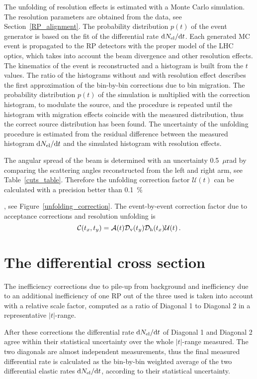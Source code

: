 \documentclass[TOTEM]{cernphprep}
\begin{document}
{		The unfolding of resolution effects is estimated with a Monte Carlo simulation. The resolution parameters are obtained from the data, see Section~\ref{RP_alignment}. The probability distribution $p(t)$ of the
		event generator is based on the fit of the differential rate ${\rm d}N_{\rm el}/{\rm d}t$. Each generated MC event is propagated to the RP detectors with the proper model of the LHC optics, which takes
		into account the beam divergence and other resolution effects. The kinematics of the event is reconstructed and a histogram is built from
		the $t$ values. The ratio of the histograms without and with resolution effect describes the first approximation of the bin-by-bin corrections due to bin migration. The probability distribution
		$p(t)$ of the simulation is multiplied with the correction histogram, to modulate the source, and the procedure is repeated until the histogram with migration effects
		coincide with the measured distribution, thus the correct source distribution has been found. The uncertainty of the unfolding procedure is estimated from the residual difference between the measured histogram
		${\rm d}N_{\rm el}/{\rm d}t$ and the simulated histogram with resolution effects.

		The angular spread of the beam is determined with an
		uncertainty 0.5~$\mu$rad by comparing the scattering angles reconstructed from the left and right arm, see Table~\ref{cuts_table}. Therefore 
    		the unfolding correction factor $\mathcal{U}(t)$ can be calculated with a precision better than 0.1~\%}, see Figure~\ref{unfolding_correction}.
 		The event-by-event correction factor due to acceptance corrections and resolution unfolding is
		\begin{equation}
			\mathcal{C}(t_{x},t_{y})=\mathcal{A}(t)\mathcal{D}_{\rm v}(t_{y})\mathcal{D}_{\rm h}(t_{x})\mathcal{U}(t)\,.
		\end{equation}

\section{The differential cross section}
\label{differential_cross_section_section}
	The inefficiency corrections due to pile-up from background and inefficiency due to an additional
	inefficiency of one RP out of the three used is taken into account with a relative scale factor, computed as a ratio of Diagonal 1 to Diagonal 2 in a representative $|t|$-range. 

	After these corrections the differential rate ${\rm d}N_{\rm el}/{\rm d}t$ of Diagonal 1 and Diagonal 2 agree within their statistical uncertainty over the whole $|t|$-range measured. The two diagonals are almost
	independent measurements, thus the final measured differential rate is calculated as the bin-by-bin weighted average of the two differential elastic rates ${\rm d}N_{\rm el}/{\rm d}t$, according to their statistical uncertainty.
\end{document}
